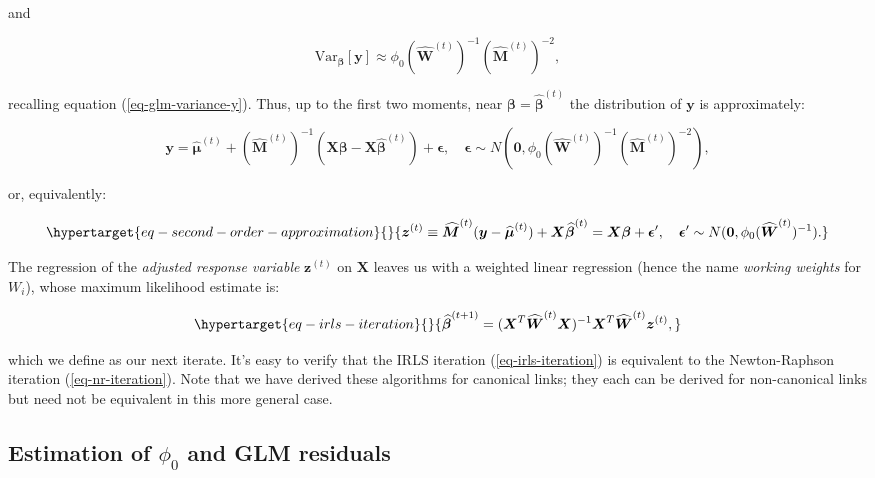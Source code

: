 \documentclass[
  11pt,
  letterpaper,
  oneside]{book}
\theoremstyle{plain}
\theoremstyle{plain}
\theoremstyle{definition}
\theoremstyle{definition}
\theoremstyle{plain}
\theoremstyle{remark}
\begin{document}
and

\[
\text{Var}_{\boldsymbol{\beta}}[\boldsymbol{y}] \approx \phi_0 (\boldsymbol{\widehat W}^{(t)})^{-1}(\boldsymbol{\widehat M}^{(t)})^{-2},
\]

recalling equation (\ref{eq-glm-variance-y}). Thus, up to the first two
moments, near \(\boldsymbol{\beta} = \boldsymbol{\widehat \beta}^{(t)}\)
the distribution of \(\boldsymbol{y}\) is approximately:

\[
\boldsymbol{y} = \boldsymbol{\widehat \mu}^{(t)} + (\boldsymbol{\widehat M}^{(t)})^{-1}(\boldsymbol{X} \boldsymbol{\beta} - \boldsymbol{X} \boldsymbol{\widehat \beta}^{(t)}) + \boldsymbol{\epsilon}, \quad \boldsymbol{\epsilon} \sim N\left(\boldsymbol{0}, \phi_0 (\boldsymbol{\widehat W}^{(t)})^{-1}(\boldsymbol{\widehat M}^{(t)})^{-2}\right),
\]

or, equivalently:

\begin{equation}\protect\hypertarget{eq-second-order-approximation}{}{
\boldsymbol{z}^{(t)} \equiv \boldsymbol{\widehat M}^{(t)}(\boldsymbol{y} - \boldsymbol{\widehat \mu}^{(t)}) + \boldsymbol{X} \boldsymbol{\widehat \beta}^{(t)} = \boldsymbol{X} \boldsymbol{\beta} + \boldsymbol{\epsilon}', \quad \boldsymbol{\epsilon}' \sim N(\boldsymbol{0}, \phi_0 (\boldsymbol{\widehat W}^{(t)})^{-1}).
}\label{eq-second-order-approximation}\end{equation}

The regression of the \emph{adjusted response variable}
\(\boldsymbol{z}^{(t)}\) on \(\boldsymbol{X}\) leaves us with a weighted
linear regression (hence the name \emph{working weights} for \(W_i\)),
whose maximum likelihood estimate is:

\begin{equation}\protect\hypertarget{eq-irls-iteration}{}{
\boldsymbol{\widehat \beta}^{(t+1)} = (\boldsymbol{X}^T \boldsymbol{\widehat W}^{(t)} \boldsymbol{X})^{-1} \boldsymbol{X}^T \boldsymbol{\widehat W}^{(t)} \boldsymbol{z}^{(t)},
}\label{eq-irls-iteration}\end{equation}

which we define as our next iterate. It's easy to verify that the IRLS
iteration (\ref{eq-irls-iteration}) is equivalent to the Newton-Raphson
iteration (\ref{eq-nr-iteration}). Note that we have derived these
algorithms for canonical links; they each can be derived for
non-canonical links but need not be equivalent in this more general
case.

\hypertarget{sec-glm-residuals}{%
\subsection{\texorpdfstring{Estimation of \(\phi_0\) and GLM
residuals}{Estimation of \textbackslash phi\_0 and GLM residuals}}\label{sec-glm-residuals}}
\end{document}
